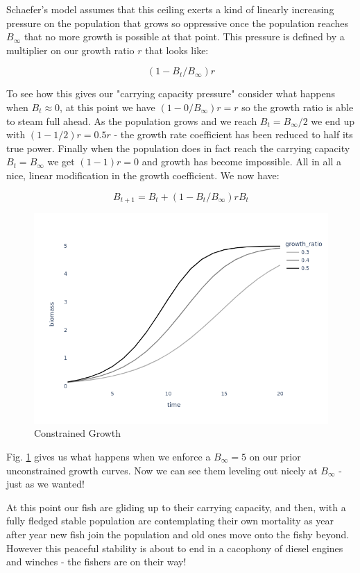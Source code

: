 \documentclass[11pt,a5paper]{book}
\begin{document}
Schaefer's model assumes that this ceiling exerts a kind of linearly increasing pressure on the population that grows so oppressive once the population reaches $B_\infty$ that no more growth is possible at that point. This pressure is defined by a multiplier on our growth ratio $r$ that looks like:

$$(1-B_t/B_\infty)r$$

To see how this gives our "carrying capacity pressure" consider what happens when $B_t\approx 0$, at this point we have $(1-0/B_\infty)r=r$ so the growth ratio is able to steam full ahead. As the population grows and we reach $B_t=B_\infty / 2$ we end up with $(1-1/2)r =0.5r$ - the growth rate coefficient has been reduced to half its true power. Finally when the population does in fact reach the carrying capacity $B_t=B_\infty$ we get $(1-1)r=0$ and growth has become impossible. All in all a nice, linear modification in the growth coefficient. We now have:

$$B_{t+1} = B_{t} + (1 - B_t/B_\infty)rB_t$$

\begin{figure}[h!] 
  \includegraphics[width=\linewidth]{notebooks/SurplusModels/capped_growth.png}
  \caption{Constrained Growth}
  \label{fig:constrained_growth}
\end{figure}

Fig. \ref{fig:constrained_growth} gives us what happens when we enforce a $B_\infty = 5$ on our prior unconstrained growth curves. Now we can see them leveling out nicely at $B_\infty$ - just as we wanted!
\newline

At this point our fish are gliding up to their carrying capacity, and then, with a fully fledged stable population are contemplating their own mortality as year after year new fish join the population and old ones move onto the fishy beyond. However this peaceful stability is about to end in a cacophony of diesel engines and winches - the fishers are on their way!
\newline
\end{document}
